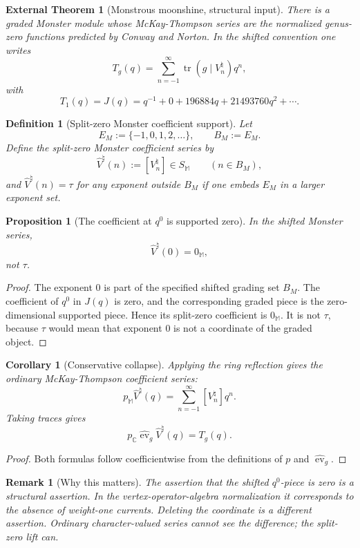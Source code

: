\documentclass[11pt]{article}
\newtheorem{proposition}[theorem]{Proposition}
\newtheorem{corollary}[theorem]{Corollary}
\newtheorem{definition}[theorem]{Definition}
\newtheorem{remark}[theorem]{Remark}
\newtheorem{inputthm}[theorem]{External Theorem}
\newcommand{\CC}{\mathbb C}
\newcommand{\tr}{\operatorname{tr}}
\newcommand{\ev}{\operatorname{ev}}
\begin{document}
\begin{inputthm}[Monstrous moonshine, structural input]
There is a graded Monster module whose McKay-Thompson series are the normalized genus-zero functions predicted by Conway and Norton.  In the shifted convention one writes
\[
T_g(q)=\sum_{n=-1}^{\infty}\tr(g\mid V_n^\natural)q^n,
\]
with
\[
T_1(q)=J(q)=q^{-1}+0+196884q+21493760q^2+\cdots.
\]
\end{inputthm}

\begin{definition}[Split-zero Monster coefficient support]
Let
\[
E_M:=\{-1,0,1,2,\ldots\},
\qquad
B_M:=E_M.
\]
Define the split-zero Monster coefficient series by
\[
\widehat V^\natural(n):=[V_n^\natural]\in S_{\mathbb M}
\qquad(n\in B_M),
\]
and \(\widehat V^\natural(n)=\tau\) for any exponent outside \(B_M\) if one embeds \(E_M\) in a larger exponent set.
\end{definition}

\begin{proposition}[The coefficient at \(q^0\) is supported zero]
In the shifted Monster series,
\[
\widehat V^\natural(0)=0_{\mathbb M},
\]
not \(\tau\).
\end{proposition}

\begin{proof}
The exponent \(0\) is part of the specified shifted grading set \(B_M\).  The coefficient of \(q^0\) in \(J(q)\) is zero, and the corresponding graded piece is the zero-dimensional supported piece.  Hence its split-zero coefficient is \(0_{\mathbb M}\).  It is not \(\tau\), because \(\tau\) would mean that exponent \(0\) is not a coordinate of the graded object.
\end{proof}

\begin{corollary}[Conservative collapse]
Applying the ring reflection gives the ordinary McKay-Thompson coefficient series:
\[
p_{\mathbb M}\widehat V^\natural(q)=\sum_{n=-1}^{\infty}[V_n^\natural]q^n.
\]
Taking traces gives
\[
p_\CC\widehat{\ev}_g\widehat V^\natural(q)=T_g(q).
\]
\end{corollary}

\begin{proof}
Both formulas follow coefficientwise from the definitions of \(p\) and \(\widehat{\ev}_g\).
\end{proof}

\begin{remark}[Why this matters]
The assertion that the shifted \(q^0\)-piece is zero is a structural assertion.  In the vertex-operator-algebra normalization it corresponds to the absence of weight-one currents.  Deleting the coordinate is a different assertion.  Ordinary character-valued series cannot see the difference; the split-zero lift can.
\end{remark}
\end{document}
